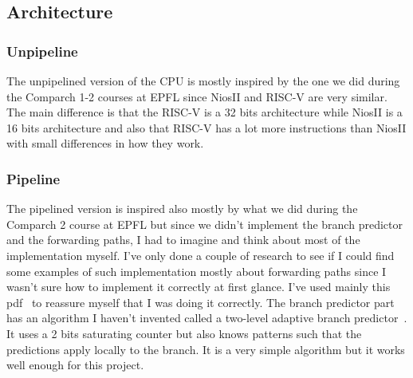 \subsection{Architecture}
\subsubsection{Unpipeline}
The unpipelined version of the CPU is mostly inspired by the one we did during the Comparch 1-2
courses at EPFL since NiosII and RISC-V are very similar. The main difference is that the RISC-V
is a 32 bits architecture while NiosII is a 16 bits architecture and also that RISC-V has a lot more
instructions than NiosII with small differences in how they work. 

\subsubsection{Pipeline}
The pipelined version is inspired also mostly by what we did during the Comparch 2 course at EPFL but
since we didn't implement the branch predictor and the forwarding paths, I had to imagine and think about 
most of the implementation myself. I've only done a couple of research to see if I could find some examples of 
such implementation mostly about forwarding paths since I wasn't sure how to implement it correctly at first 
glance. I've used mainly this pdf~\cite{forwarding_paths} to reassure myself that I was doing it correctly.
The branch predictor part has an algorithm I haven't invented called a two-level adaptive branch predictor~\cite{two_level_adaptive}.
It uses a 2 bits saturating counter but also knows patterns such that the predictions apply locally to the 
branch. It is a very simple algorithm but it works well enough for this project.